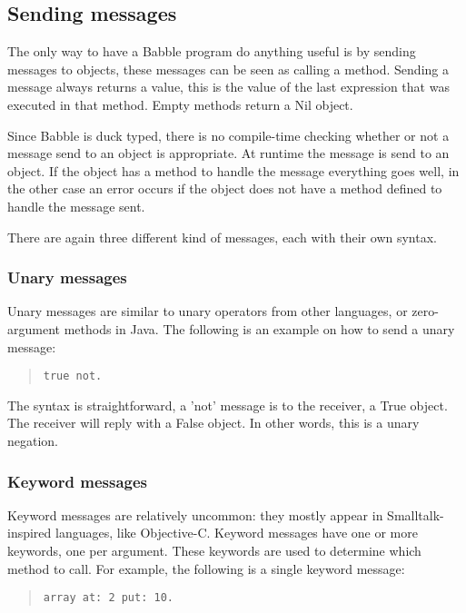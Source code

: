 \documentclass[a4paper]{article}
\begin{document}
\subsection{Sending messages}

The only way to have a Babble program do anything useful is by sending messages to objects, these messages can be seen as calling a method. Sending a message always returns a value, this is the value of the last expression that was executed in that method. Empty methods return a Nil object.

Since Babble is duck typed, there is no compile-time checking whether or not a message send to an object is appropriate. At runtime the message is send to an object. If the object has a method to handle the message everything goes well, in the other case an error occurs if the object does not have a method defined to handle the message sent.

There are again three different kind of messages, each with their own syntax.


\subsubsection{Unary messages}

Unary messages are similar to unary operators from other languages, or zero-argument methods in Java.
The following is an example on how to send a unary message:

\begin{quote}
\begin{lstlisting}
true not.
\end{lstlisting}
\end{quote}

The syntax is straightforward, a 'not' message is to the receiver, a True object.
The receiver will reply with a False object. In other words, this is a unary negation.

\subsubsection{Keyword messages}

Keyword messages are relatively uncommon: they mostly appear in Smalltalk-inspired languages, like Objective-C.
Keyword messages have one or more keywords, one per argument.
These keywords are used to determine which method to call.
For example, the following is a single keyword message:

\begin{quote}
\begin{lstlisting}
array at: 2 put: 10.
\end{lstlisting}
\end{quote}
\end{document}
